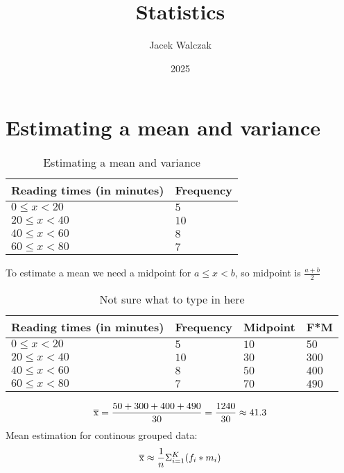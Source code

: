 \documentclass{article}
\title{Statistics}
\author{Jacek Walczak}
\date{2025}
\begin{document}
\maketitle

\section{Estimating a mean and variance}
\begin{table}[htbp]
  \centering
  \begin{tabular}{|l|l|}
    \hline
    \textbf{Reading times (in minutes)} & \textbf{Frequency} \\
    \hline
    $0 \leqslant x < 20$ & $5$ \\
    \hline
    $20 \leqslant x < 40$ & $10$ \\
    \hline
    $40 \leqslant x < 60$ & $8$ \\
    \hline
    $60 \leqslant x < 80$ & $7$ \\
    \hline
  \end{tabular}
  \caption{Estimating a mean and variance}
  \label{tab:estimating_a_mean_and_variance}
\end{table}
To estimate a mean we need a midpoint for $a \leqslant x < b$, so midpoint is $\frac{a+b}{2}$
\begin{table}[htbp]
  \centering
  \begin{tabular}{|l|l|l|l|}
    \hline
    \textbf{Reading times (in minutes)} & \textbf{Frequency} & \textbf{Midpoint} & \textbf{F*M} \\
    \hline
    $0 \leqslant x < 20$ & $5$ & $10$ & $50$ \\
    \hline
    $20 \leqslant x < 40$ & $10$ & $30$ & $300$ \\
    \hline
    $40 \leqslant x < 60$ & $8$ & $50$ & $400$ \\
    \hline
    $60 \leqslant x < 80$ & $7$ & $70$ & $490$ \\
    \hline
  \end{tabular}
  \caption{Not sure what to type in here}
  \label{tab:estimating_a_mean_and_variance_2}
\end{table}
\begin{equation}
  \overline{\rm x} = \frac{50+300+400+490}{30} = \frac{1240}{30} \approx 41.3
\end{equation}
Mean estimation for continous grouped data:
\begin{equation}
  \overline{\rm x} \approx \frac{1}{n}\Sigma^K_{i=1}(f_i * m_i)
\end{equation}
\end{document}

